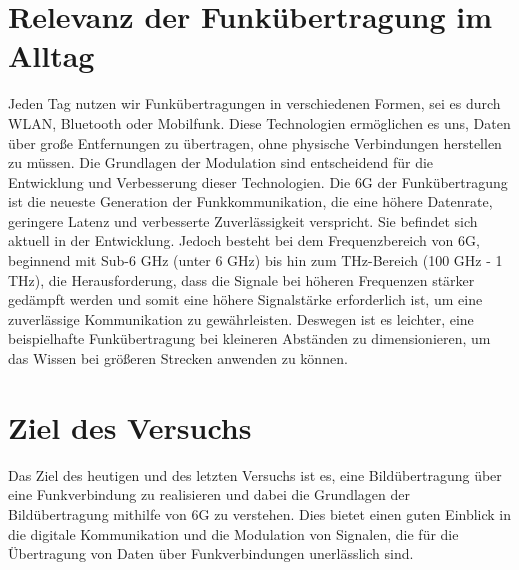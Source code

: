 \section{Relevanz der Funkübertragung im Alltag}
Jeden Tag nutzen wir Funkübertragungen in verschiedenen Formen, sei es durch WLAN, Bluetooth oder Mobilfunk. Diese Technologien ermöglichen es uns, Daten über große Entfernungen zu übertragen, ohne physische Verbindungen herstellen zu müssen. Die Grundlagen der Modulation sind entscheidend für die Entwicklung und Verbesserung dieser Technologien.
Die \ac{6G} der Funkübertragung ist die neueste Generation der Funkkommunikation, die eine höhere Datenrate, geringere Latenz und verbesserte Zuverlässigkeit verspricht. Sie befindet sich aktuell in der Entwicklung. 
Jedoch besteht bei dem Frequenzbereich von \ac{6G}, beginnend mit Sub-6 GHz (unter 6 GHz) bis hin zum THz-Bereich (100 GHz - 1 THz), 
die Herausforderung, dass die Signale bei höheren Frequenzen stärker gedämpft werden und somit eine höhere Signalstärke erforderlich ist, um eine zuverlässige Kommunikation zu gewährleisten.
Deswegen ist es leichter, eine beispielhafte Funkübertragung bei kleineren Abständen zu dimensionieren, um das Wissen bei größeren Strecken anwenden zu können.
\section{Ziel des Versuchs}
Das Ziel des heutigen und des letzten Versuchs ist es, eine Bildübertragung über eine Funkverbindung zu realisieren und dabei die Grundlagen der Bildübertragung mithilfe von 6G zu verstehen.
Dies bietet einen guten Einblick in die digitale Kommunikation und die Modulation von Signalen, die für die Übertragung von Daten über Funkverbindungen unerlässlich sind.
\clearpage 